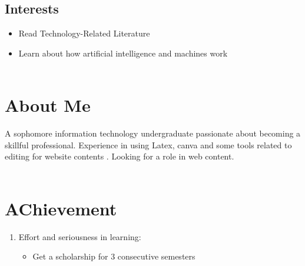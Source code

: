 \documentclass[11pt,oneside,a4paper,titlepage]{article}
\begin{document}
\begin{tcolorbox}
\begin{minipage}[t]{8cm}
\begin{tcolorbox}[grow to left by=0.6cm,colback=gray!25,colframe=white]
        \section*{Interests}
        \begin{itemize}
            \item {Read Technology-Related Literature}
            \item {Learn about how artificial intelligence and machines work} \\ \\
        \end{itemize}
        \end{tcolorbox}
    \end{minipage}
    \begin{minipage}[t]{11cm}
        \vspace*{-0.5cm}
        \begin{tcolorbox}[grow to right by=0.75cm,colframe=white,colback=white]
        \section*{About Me}
        A sophomore information technology undergraduate passionate about becoming a skillful professional. Experience in using Latex, canva and some tools related to editing for website contents . Looking for a role in web content. \\ \\
        \section*{AChievement}
        \begin{enumerate}
            \item {Effort and seriousness in learning: }
            \begin{itemize}
            \item {Get a scholarship for 3 consecutive semesters}\\ \\ 
            \end{itemize}
        \end{enumerate}  

\end{tcolorbox}
\end{minipage}
\end{tcolorbox}
\end{document}
